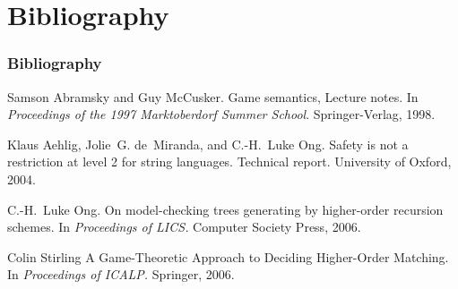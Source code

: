 \section{Bibliography}
\begin{frame} \frametitle<presentation>{Bibliography}

  \begin{thebibliography}{10}
  \beamertemplatearticlebibitems
    Samson Abramsky and Guy McCusker.
    \newblock Game semantics, Lecture notes.
    \newblock In {\em Proceedings of the 1997 Marktoberdorf Summer School}. Springer-Verlag, 1998.

    Klaus Aehlig, Jolie~G. de~Miranda, and C.-H.~Luke Ong.
    \newblock Safety is not a restriction at level 2 for string languages.
    \newblock Technical report. University of Oxford, 2004.

    C.-H.~Luke Ong.
    \newblock On model-checking trees generating by higher-order recursion schemes.
    \newblock In {\em Proceedings of LICS.} Computer Society Press, 2006.

    Colin Stirling
    \newblock A Game-Theoretic Approach to Deciding Higher-Order Matching.
    \newblock In {\em Proceedings of ICALP.} Springer, 2006.

  \end{thebibliography}
\end{frame}


